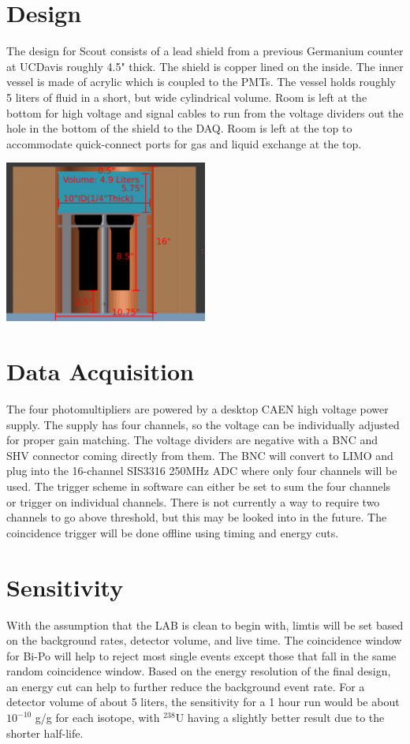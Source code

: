 \documentclass[]{article}
\begin{document}
\section{Design}
The design for Scout consists of a lead shield from a previous Germanium counter at
UCDavis roughly 4.5" thick. The shield is copper lined on the inside. The inner vessel
is made of acrylic which is
coupled to the PMTs. The vessel holds roughly 5 liters of fluid in a short, but wide
cylindrical volume.
Room is left at the bottom for high voltage and signal cables to run from the voltage
dividers out the hole in the bottom of the shield to the DAQ. Room is left at the top to
accommodate quick-connect ports for gas and liquid exchange at the top.
\begin{center}
\includegraphics[width=0.5\textwidth]{flat_scout.png}
\end{center}

\section{Data Acquisition}
The four photomultipliers are powered by a desktop CAEN high voltage power supply. The supply
has four channels, so the voltage can be individually adjusted for proper gain matching. The
voltage dividers are negative with a BNC and SHV connector coming directly from them. The BNC
will convert to LIMO and plug into the 16-channel SIS3316 250MHz ADC where only four channels
will be used. The trigger scheme in software can either be set to sum the four channels or
trigger on individual channels. There is not currently a way to require two channels to go
above threshold, but this may be looked into in the future. The coincidence trigger will be
done offline using timing and energy cuts.

\section{Sensitivity}
With the assumption that the LAB is clean to begin with, limtis will be set based on the background
rates, detector volume, and live time. The coincidence window for Bi-Po will help to reject most single
events except those that fall in the same random coincidence window. Based on the energy resolution
of the final design, an energy cut can help to further reduce the background event rate. For a detector
volume of about 5 liters, the sensitivity for a 1 hour run would be about $10^{-10}$ g/g for each
isotope, with $^{238}$U having a slightly better result due to the shorter half-life.
\end{document}
